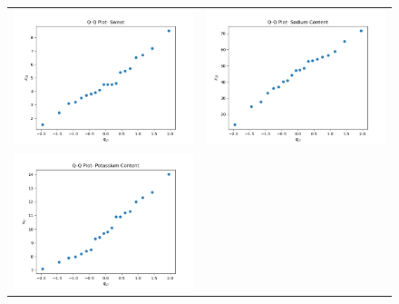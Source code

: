 \begin{enumerate}[label=(\alph*)]
    \begin{figure}[H]
        \centering
        \begin{tabular}{cc}
            \includegraphics[scale=0.325]{./python/chapter-5/Exercise-5-4-QQ-Sweat.png} &
            \includegraphics[scale=0.325]{./python/chapter-5/Exercise-5-4-QQ-Sodium.png} \\
            \includegraphics[scale=0.325]{./python/chapter-5/Exercise-5-4-QQ-Potassium.png}

\end{tabular}
\end{figure}
\end{enumerate}
